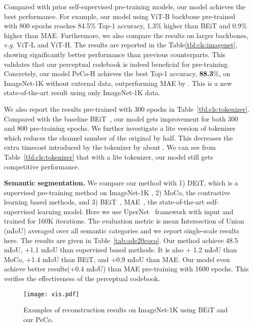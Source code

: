 \documentclass[letterpaper]{article} \usepackage{aaai23}  \usepackage{times}  \usepackage{helvet}  \usepackage{courier}  \usepackage[hyphens]{url}  \usepackage{graphicx} \urlstyle{rm} \def\UrlFont{\rm}  \usepackage{natbib}  \usepackage{caption} \frenchspacing  \setlength{\pdfpagewidth}{8.5in}  \setlength{\pdfpageheight}{11in}  \usepackage{algorithm}
\newcommand{\eg}{\textit{e.g. }}
\begin{document}
Compared with prior self-supervised pre-training models,
our model achieves the best performance.
For example, 
our model using ViT-B backbone pre-trained with 800 epochs reaches 84.5\% Top-1 accuracy,
1.3\% higher than BEiT and 0.9\% higher than MAE.
Furthermore, we also compare the results on larger backbones, \eg ViT-L and ViT-H.
The results are reported in the Table\ref{tbl:cls:imagenet}, showing significantly better performance than previous counterparts. 
This validates that our perceptual codebook is indeed beneficial for pre-training. 
Concretely,
our model PeCo-H achieves the best Top-1 accuracy, \textbf{88.3}\%, on ImageNet-1K without external data, outperforming MAE by . This is a new state-of-the-art result using only ImageNet-1K data.
 
We also report the results pre-trained with 300 epochs in Table~\ref{tbl:cls:tokenizer}.
Compared with the baseline BEiT~\cite{bao2021beit}, our model gets 
improvement for both 300 and 800 pre-training epochs. 
We further investigate a lite version of tokenizer which reduces the channel number of the original by half. This decreases the extra timecost introduced by the tokenizer by about .
We can see from Table~\ref{tbl:cls:tokenizer} that with a lite tokenizer, our model still gets competitive performance.




\noindent \textbf{Semantic segmentation.}
We compare our method with 1) DEiT, which is a supervised pre-training method on ImageNet-1K , 2) MoCo, the contrastive learning based methods, and 3) BEiT~\cite{bao2021beit}, MAE~\cite{he2021masked}, the state-of-the-art self-supervised learning model. Here we use UperNet~\cite{xiao2018unified} framework with  input and trained for 160K iterations. 
The evaluation metric is mean Intersection of Union (mIoU) averaged over all semantic categories and we report single-scale results here.
The results are given in Table~\ref{tab:ade20coco}. Our method achieve 48.5 mIoU, +1.1 mIoU than supervised based methods. It is also + 1.2 mIoU than MoCo, +1.4 mIoU than BEiT, and +0.9 mIoU than MAE. Our model even achieve better results(+0.4 mIoU) than MAE pre-training with 1600 epochs. This verifies the effectiveness of the perceptual codebook.




\begin{figure*}[t]\centering
\texttt{[image: vis.pdf]}
\caption{Examples of reconstruction results on ImageNet-1K using BEiT and our PeCo.} \label{fig:mask_prediction_com}
\end{figure*}
\end{document}
